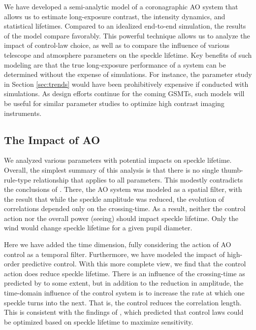 \documentclass[10pt,preprint]{aastex631}
\begin{document}
We have developed a semi-analytic model of a coronagraphic AO system that allows us to estimate long-exposure contrast, the intensity dynamics, and statistical lifetimes.  Compared to an idealized end-to-end simulation, the results of the model compare favorably.  This powerful technique allows us to analyze the impact of control-law choice, as well as to compare the influence of various telescope and atmosphere parameters on the speckle lifetime.  Key benefits of such modeling are that the true long-exposure performance of a system can be determined without the expense of simulations.  For instance, the parameter study in Section \ref{sec:trends} would have been prohibitively expensive if conducted with simulations. As design efforts continue for the coming GSMTs, such models will be useful for similar parameter studies to optimize high contrast imaging instruments.

\subsection{The Impact of AO}

We analyzed various parameters with potential impacts on speckle lifetime.  Overall, the simplest summary of this analysis is that there is no single thumb-rule-type relationship that applies to all parameters.  This modestly contradicts the conclusions of \citet{2005SPIE.5903..170M}.  There, the AO system was modeled as a spatial filter, with the result that while the speckle amplitude was reduced, the evolution of correlations depended only on the crossing-time.  As a result, neither the control action nor the overall power (seeing) should impact speckle lifetime.  Only the wind would change speckle lifetime for a given pupil diameter.

Here we have added the time dimension, fully considering the action of AO control as a temporal filter.  Furthermore, we have modeled the impact of high-order predictive control.  With this more complete view, we find that the control action does reduce speckle lifetime.  There is an influence of the crossing-time as predicted by \citet{2005SPIE.5903..170M} to some extent, but in addition to the reduction in amplitude, the time-domain influence of the control system is to increase the rate at which one speckle turns into the next.  That is, the control reduces the correlation length.  This is consistent with the findings of \citet{2006OExpr..14.7499P}, which predicted that control laws could be optimized based on speckle lifetime to maximize sensitivity.
\end{document}
